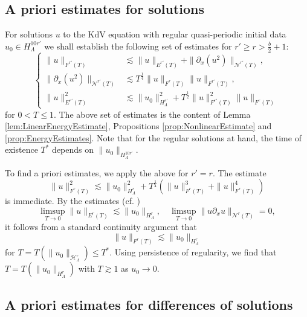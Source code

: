 \documentclass{amsart}
\theoremstyle{definition}
\begin{document}
\subsection{A priori estimates for solutions}

For solutions $u$ to the KdV equation with regular quasi-periodic initial data $u_0 \in H^{10 r'}_\Lambda$ we shall establish the following set of estimates for $r' \geq r > \frac{b}{2}+1$:
\begin{equation*}
\left\{ \begin{array}{cl}
\| u \|_{F^{r'}(T)} &\lesssim \| u \|_{E^{r'}(T)} + \| \partial_x (u^2) \|_{\mathcal{N}^{r'}(T)}, \\
\| \partial_x (u^2) \|_{\mathcal{N}^{r'}(T)} &\lesssim T^{\frac{1}{4}} \| u \|_{F^{r}(T)} \| u \|_{F^{r'}(T)}, \\
\| u \|_{E^{r'}(T)}^2 &\lesssim \| u_0 \|^2_{H^{r'}_{\Lambda}} + T^{\frac{1}{2}} \| u \|_{F^{r'}(T)}^2 \| u \|_{F^{r}(T)}
\end{array} \right.
\end{equation*}
for $0<T\leq 1$. The above set of estimates is the content of Lemma \ref{lem:LinearEnergyEstimate}, Propositions \ref{prop:NonlinearEstimate} and \ref{prop:EnergyEstimates}. Note that for the regular solutions at hand, the time of existence $T^*$ depends on $\| u_0 \|_{H^{10 r'}_\Lambda}$.

To find a priori estimates, we apply the above for $r'=r$.
The estimate
\begin{equation*}
\| u \|_{F^{r}(T)}^2 \lesssim \| u_0 \|^2_{H^{r}_\Lambda} + T^{\frac{1}{4}} (\| u \|_{F^{r}(T)}^3 + \| u \|^4_{F^{r}(T)})
\end{equation*}
is immediate. By the estimates (cf. \cite{IonescuKenigTataru2008})
\begin{equation*}
\limsup_{T \to 0} \| u \|_{E^{r}(T)} \lesssim \| u_0 \|_{H^{r}_{\Lambda}}, \quad \limsup_{T \to 0} \| u \partial_x u \|_{\mathcal{N}^{r}(T)} = 0,
\end{equation*}
it follows from a standard continuity argument that
\begin{equation*}
\| u \|_{F^{r}(T)} \lesssim \| u_0 \|_{H^{r}_{\Lambda}}
\end{equation*}
for $T=T(\| u_0 \|_{\mathcal{H}^{r}_{\Lambda}}) \leq T^*$. Using persistence of regularity, we find that $T=T(\| u_0 \|_{H^r_\Lambda})$ with $T \gtrsim 1$ as $u_0 \to 0$.


\subsection{A priori estimates for differences of solutions}
\end{document}
